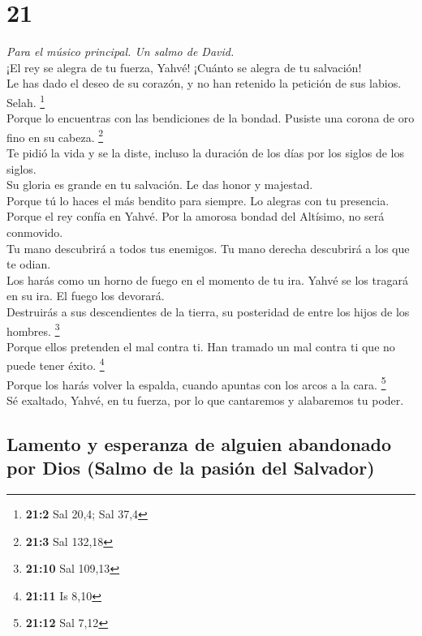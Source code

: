 \hypertarget{section-20}{%
\section{21}\label{section-20}}

\emph{Para el músico principal. Un salmo de David.}\\
 ¡El rey se alegra de tu fuerza, Yahvé! ¡Cuánto se alegra
de tu salvación!\\
 Le has dado el deseo de su corazón, y no han retenido la
petición de sus labios. Selah. \footnote{\textbf{21:2} Sal 20,4; Sal
  37,4}\\
 Porque lo encuentras con las bendiciones de la bondad.
Pusiste una corona de oro fino en su cabeza. \footnote{\textbf{21:3} Sal
  132,18}\\
 Te pidió la vida y se la diste, incluso la duración de
los días por los siglos de los siglos.\\
 Su gloria es grande en tu salvación. Le das honor y
majestad.\\
 Porque tú lo haces el más bendito para siempre. Lo
alegras con tu presencia.\\
 Porque el rey confía en Yahvé. Por la amorosa bondad del
Altísimo, no será conmovido.\\
 Tu mano descubrirá a todos tus enemigos. Tu mano derecha
descubrirá a los que te odian.\\
 Los harás como un horno de fuego en el momento de tu ira.
Yahvé se los tragará en su ira. El fuego los devorará.\\
 Destruirás a sus descendientes de la tierra, su
posteridad de entre los hijos de los hombres. \footnote{\textbf{21:10}
  Sal 109,13}\\
 Porque ellos pretenden el mal contra ti. Han tramado un
mal contra ti que no puede tener éxito. \footnote{\textbf{21:11} Is 8,10}\\
 Porque los harás volver la espalda, cuando apuntas con
los arcos a la cara. \footnote{\textbf{21:12} Sal 7,12}\\
 Sé exaltado, Yahvé, en tu fuerza, por lo que cantaremos
y alabaremos tu poder.

\hypertarget{lamento-y-esperanza-de-alguien-abandonado-por-dios-salmo-de-la-pasiuxf3n-del-salvador}{%
\subsection{Lamento y esperanza de alguien abandonado por Dios (Salmo de
la pasión del
Salvador)}\label{lamento-y-esperanza-de-alguien-abandonado-por-dios-salmo-de-la-pasiuxf3n-del-salvador}}

